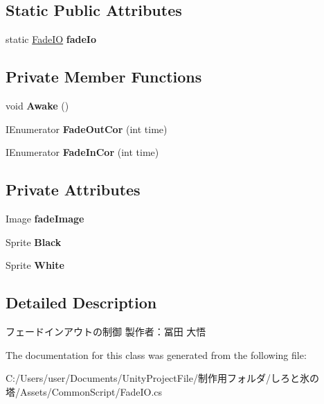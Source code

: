 \subsection*{Static Public Attributes}
\begin{DoxyCompactItemize}
\item 
\mbox{\label{class_fade_i_o_ac4236f41809c7fa05ead718312b30dd9}} 
static \hyperlink{class_fade_i_o}{Fade\+IO} {\bfseries fade\+Io}
\end{DoxyCompactItemize}
\subsection*{Private Member Functions}
\begin{DoxyCompactItemize}
\item 
\mbox{\label{class_fade_i_o_ae4815657dfc83f669fcb0cc9eb2d9681}} 
void {\bfseries Awake} ()
\item 
\mbox{\label{class_fade_i_o_af5a1f073ea11bb128d732e2b219c1942}} 
I\+Enumerator {\bfseries Fade\+Out\+Cor} (int time)
\item 
\mbox{\label{class_fade_i_o_a42d75b6d2a705ce531137ec51a43ab36}} 
I\+Enumerator {\bfseries Fade\+In\+Cor} (int time)
\end{DoxyCompactItemize}
\subsection*{Private Attributes}
\begin{DoxyCompactItemize}
\item 
\mbox{\label{class_fade_i_o_a40c03026c33bd3a8b563bae3caf97885}} 
Image {\bfseries fade\+Image}
\item 
\mbox{\label{class_fade_i_o_a1751936691e63bd4fb02fa6a8ef8a8f2}} 
Sprite {\bfseries Black}
\item 
\mbox{\label{class_fade_i_o_aa6a655e593b9fe2f3083220a66b68be8}} 
Sprite {\bfseries White}
\end{DoxyCompactItemize}


\subsection{Detailed Description}
フェードインアウトの制御 製作者：冨田 大悟 



The documentation for this class was generated from the following file\+:\begin{DoxyCompactItemize}
\item 
C\+:/\+Users/user/\+Documents/\+Unity\+Project\+File/制作用フォルダ/しろと氷の塔/\+Assets/\+Common\+Script/Fade\+I\+O.\+cs\end{DoxyCompactItemize}
